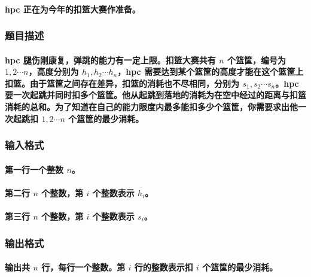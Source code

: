 \documentclass[final,11pt,oneside,UTF8]{report}
\begin{document}
\paragraph{
    hpc 正在为今年的扣篮大赛作准备。
}
\subsubsection{题目描述}
\paragraph{
    hpc 腿伤刚康复，弹跳的能力有一定上限。扣篮大赛共有 $n$ 个篮筐，编号为 $1,2\cdots n$，高度分别为 $h_1,h_2\cdots h_n$，hpc 需要达到某个篮筐的高度才能在这个篮筐上扣篮。由于篮筐之间存在差异，扣篮的消耗也不尽相同，分别为 $s_1,s_2\cdots s_n$。hpc 要一次起跳并同时扣多个篮筐。他从起跳到落地的消耗为在空中经过的距离与扣篮消耗的总和。为了知道在自己的能力限度内最多能扣多少个篮筐，你需要求出他一次起跳扣 $1,2\cdots n$ 个篮筐的最少消耗。
}
\subsubsection{输入格式}
\paragraph{
    第一行一个整数 $n$。
}
\paragraph{
    第二行 $n$ 个整数，第 $i$ 个整数表示 $h_i$。
}
\paragraph{
    第三行 $n$ 个整数，第 $i$ 个整数表示 $s_i$。
}
\subsubsection{输出格式}
\paragraph{
    输出共 $n$ 行，每行一个整数。第 $i$ 行的整数表示扣 $i$ 个篮筐的最少消耗。
}
\end{document}
